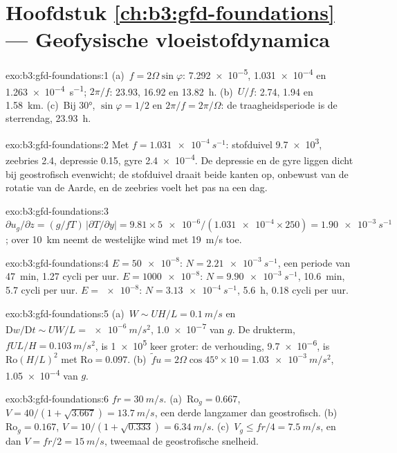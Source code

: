 \section*{Hoofdstuk \ref{ch:b3:gfd-foundations} --- Geofysische vloeistofdynamica}

\begin{solution}{exo:b3:gfd-foundations:1}
(a)~$f = 2\Omega\sin\varphi$: \num{7.292e-5}, \num{1.031e-4} en
\qty{1.263e-4}{s^{-1}}; $2\pi/f$: 23.93, 16.92 en \qty{13.82}{h}.
(b)~$U/f$: 2.74, 1.94 en \qty{1.58}{km}. (c)~Bij \ang{30}, $\sin\varphi =
1/2$ en $2\pi/f = 2\pi/\Omega$: de traagheidsperiode is de sterrendag,
\qty{23.93}{h}.
\end{solution}

\begin{solution}{exo:b3:gfd-foundations:2}
Met $f = \qty{1.031e-4}{s^{-1}}$: stofduivel \num{9.7e3}, zeebries 2.4,
depressie 0.15, gyre \num{2.4e-4}. De depressie en de gyre liggen dicht bij
geostrofisch evenwicht; de stofduivel draait beide kanten op, onbewust van de
rotatie van de Aarde, en de zeebries voelt het pas na een dag.
\end{solution}

\begin{solution}{exo:b3:gfd-foundations:3}
$\partial u_g/\partial z = (g/fT)\,|\partial T/\partial y| = 9.81\times
\num{5e-6}/(\num{1.031e-4}\times250) = \qty{1.90e-3}{s^{-1}}$; over
\qty{10}{km} neemt de westelijke wind met \qty{19}{m/s} toe.
\end{solution}

\begin{solution}{exo:b3:gfd-foundations:4}
$E = \num{50e-8}$: $N = \qty{2.21e-3}{s^{-1}}$, een periode van \qty{47}{min},
\num{1.27} cycli per uur. $E = \num{1000e-8}$: $N = \qty{9.90e-3}{s^{-1}}$,
\qty{10.6}{min}, 5.7 cycli per uur. $E = \num{e-8}$: $N =
\qty{3.13e-4}{s^{-1}}$, \qty{5.6}{h}, 0.18 cycli per uur.
\end{solution}

\begin{solution}{exo:b3:gfd-foundations:5}
(a)~$W \sim UH/L = \qty{0.1}{m/s}$ en $\mathrm Dw/\mathrm Dt \sim UW/L =
\qty{e-6}{m/s^2}$, \num{1.0e-7} van $g$. De drukterm, $fUL/H =
\qty{0.103}{m/s^2}$, is \num{1e5} keer groter: de verhouding, \num{9.7e-6}, is
$\mathrm{Ro}(H/L)^2$ met $\mathrm{Ro} = 0.097$. (b)~$\tilde fu =
2\Omega\cos\ang{45}\times10 = \qty{1.03e-3}{m/s^2}$, \num{1.05e-4} van $g$.
\end{solution}

\begin{solution}{exo:b3:gfd-foundations:6}
$fr = \qty{30}{m/s}$. (a)~$\mathrm{Ro}_g = 0.667$, $V = 40/(1 + \sqrt{3.667})
= \qty{13.7}{m/s}$, een derde langzamer dan geostrofisch. (b)~$\mathrm{Ro}_g =
0.167$, $V = 10/(1 + \sqrt{0.333}) = \qty{6.34}{m/s}$. (c)~$V_g \le fr/4 =
\qty{7.5}{m/s}$, en dan $V = fr/2 = \qty{15}{m/s}$, tweemaal de geostrofische
snelheid.
\end{solution}

